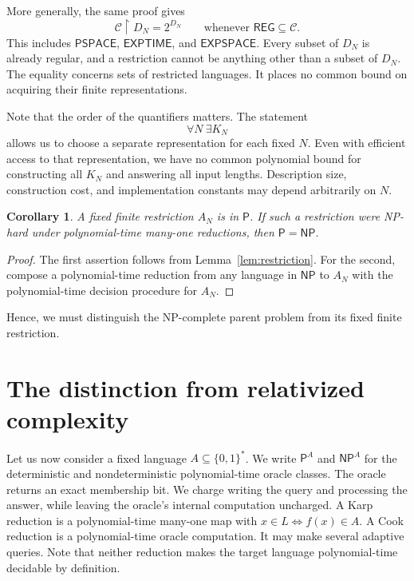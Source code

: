 \documentclass[11pt,a4paper]{article}
\numberwithin{equation}{section}
\newcommand{\Pclass}{\mathsf{P}}
\newcommand{\NPclass}{\mathsf{NP}}
\newcommand{\bits}{\{0,1\}}
\newcommand{\restr}{\mathbin{\upharpoonright}}
\theoremstyle{plain}
\newtheorem{corollary}[lemma]{Corollary}
\theoremstyle{definition}
\theoremstyle{remark}
\begin{document}
More generally, the same proof gives
\begin{equation}
\mathcal C\restr D_N=2^{D_N}
\qquad\text{whenever }\mathsf{REG}\subseteq\mathcal C.
\label{eq:general-finite}
\end{equation}
This includes $\mathsf{PSPACE}$, $\mathsf{EXPTIME}$, and $\mathsf{EXPSPACE}$. Every subset of $D_N$ is already regular, and a restriction cannot be anything other than a subset of $D_N$. The equality concerns sets of restricted languages. It places no common bound on acquiring their finite representations.

Note that the order of the quantifiers matters. The statement
\begin{equation}
\forall N\ \exists K_N
\end{equation}
allows us to choose a separate representation for each fixed $N$. Even with efficient access to that representation, we have no common polynomial bound for constructing all $K_N$ and answering all input lengths. Description size, construction cost, and implementation constants may depend arbitrarily on $N$.

\begin{corollary}
A fixed finite restriction $A_N$ is in $\Pclass$. If such a restriction were NP-hard under polynomial-time many-one reductions, then $\Pclass=\NPclass$.
\end{corollary}

\begin{proof}
The first assertion follows from Lemma~\ref{lem:restriction}. For the second, compose a polynomial-time reduction from any language in $\NPclass$ to $A_N$ with the polynomial-time decision procedure for $A_N$.
\end{proof}

Hence, we must distinguish the NP-complete parent problem from its fixed finite restriction.

\section{The distinction from relativized complexity}
\label{sec:oracles}

Let us now consider a fixed language $A\subseteq\bits^*$. We write $\Pclass^A$ and $\NPclass^A$ for the deterministic and nondeterministic polynomial-time oracle classes. The oracle returns an exact membership bit. We charge writing the query and processing the answer, while leaving the oracle's internal computation uncharged. A Karp reduction is a polynomial-time many-one map with $x\in L\iff f(x)\in A$. A Cook reduction is a polynomial-time oracle computation. It may make several adaptive queries. Note that neither reduction makes the target language polynomial-time decidable by definition.
\end{document}
